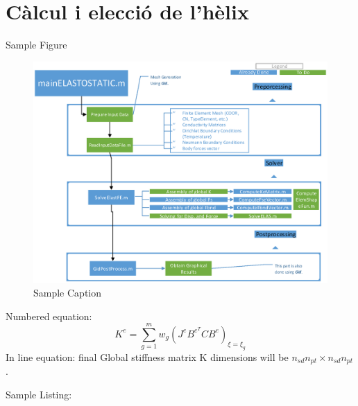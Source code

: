 \section{Càlcul i elecció de l'hèlix}
Sample Figure
\begin{figure}[H]
	\centering
	\includegraphics[scale=0.9]{./pics/sample}
	\caption{Sample Caption}
\end{figure}
Numbered equation:
\begin{equation}
	K^e = \sum_{g=1}^{m}w_g (J^eB^{e^T}C B^e)_{\xi=\xi_g}
\end{equation}
In line equation:
final Global stiffness matrix K dimensions will be $n_{sd}n_{pt}\times n_{sd}n_{pt}$.

Sample Listing:


